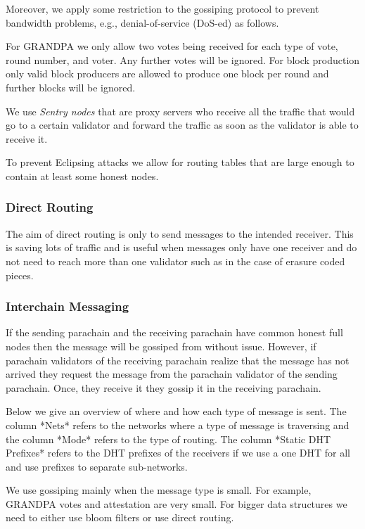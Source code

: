Moreover, we apply some restriction to the gossiping protocol to prevent bandwidth problems, e.g., denial-of-service (DoS-ed) as follows.

For GRANDPA we only allow two votes being received for each type of vote, round number, and voter. Any further votes will be ignored.
For block production only valid block producers are allowed to produce one block per round and further blocks will be ignored.

We use \emph{Sentry nodes} that are proxy servers who receive all the traffic that would go to a certain validator and forward the traffic as soon as the validator is able to receive it.

To prevent Eclipsing attacks \cite{} we allow for routing tables that are large enough to contain at least some honest nodes.

\subsubsection{Direct Routing}
The aim of direct routing is only to send messages to the intended receiver.
This is saving lots of traffic and is useful when messages only have one receiver and do not need to reach more than one validator such as in the case of erasure coded pieces.

\subsubsection{Interchain Messaging}
If the sending parachain and the receiving parachain have common honest full nodes then the message will be gossiped from without issue.
However, if parachain validators of the receiving parachain realize that the message has not arrived they request the message from the parachain validator of the sending parachain.
Once, they receive it they gossip it in the receiving parachain.


Below we give an overview of where and how each type of message is sent. The column *Nets* refers to the networks where a type of message is traversing and the column *Mode* refers to the type of  routing. The column *Static DHT Prefixes* refers to the DHT prefixes of the receivers if we use a one DHT for all and use prefixes to separate sub-networks.

We use gossiping mainly when the message type is small. For example, GRANDPA votes and attestation are very small. For bigger data structures we need to either use bloom filters or use direct routing.

